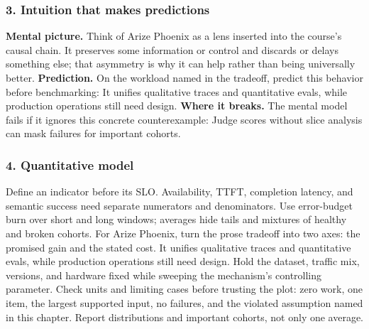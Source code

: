 \subsubsection*{3. Intuition that makes predictions}
\textbf{Mental picture.} Think of Arize Phoenix as a lens inserted into the course's causal chain. It preserves some information or control and discards or delays something else; that asymmetry is why it can help rather than being universally better.
\textbf{Prediction.} On the workload named in the tradeoff, predict this behavior before benchmarking: It unifies qualitative traces and quantitative evals, while production operations still need design.
\textbf{Where it breaks.} The mental model fails if it ignores this concrete counterexample: Judge scores without slice analysis can mask failures for important cohorts.
\subsubsection*{4. Quantitative model}
Define an indicator before its SLO. Availability, TTFT, completion latency, and semantic success need separate numerators and denominators. Use error-budget burn over short and long windows; averages hide tails and mixtures of healthy and broken cohorts.
For Arize Phoenix, turn the prose tradeoff into two axes: the promised gain and the stated cost. It unifies qualitative traces and quantitative evals, while production operations still need design. Hold the dataset, traffic mix, versions, and hardware fixed while sweeping the mechanism's controlling parameter.
Check units and limiting cases before trusting the plot: zero work, one item, the largest supported input, no failures, and the violated assumption named in this chapter. Report distributions and important cohorts, not only one average.
